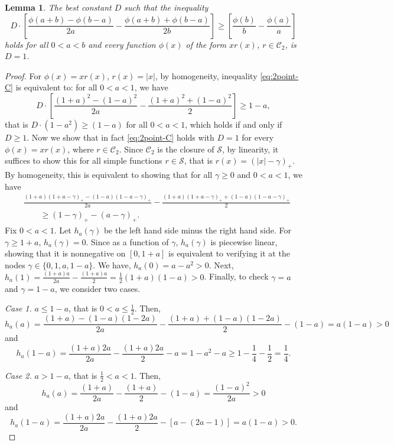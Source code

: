 \documentclass[10pt]{article}
\newcommand{\1}{\textbf{1}}
\newtheorem{lemma}[theorem]{Lemma}
\theoremstyle{remark}
\theoremstyle{definition}
\begin{document}
\begin{lemma}\label{lm:2point-C}
The best constant $D$ such that the inequality
\begin{equation}\label{eq:2point-C}
D\cdot\left[\frac{\phi(a+b)-\phi(b-a)}{2a} - \frac{\phi(a+b)+\phi(b-a)}{2b}\right] \geq \left[ \frac{\phi(b)}{b}-\frac{\phi(a)}{a}\right]
\end{equation}
holds for all $0 < a < b$ and every function $\phi(x)$ of the form $xr(x)$, $r \in \mathcal{C}_2$, is $D=1$.
\end{lemma}
\begin{proof}
For $\phi(x) = xr(x)$, $r(x) = |x|$, by homogeneity, inequality \eqref{eq:2point-C} is equivalent to: for all $0 < a < 1$, we have
\[
D\cdot\left[\frac{(1+a)^2-(1-a)^2}{2a} - \frac{(1+a)^2+(1-a)^2}{2}\right] \geq 1-a,
\]
that is $D\cdot(1-a^2) \geq (1-a)$ for all $0 < a < 1$, which holds if and only if $D \geq 1$. Now we show that in fact \eqref{eq:2point-C} holds with $D=1$ for every $\phi(x) = xr(x)$, where $r \in \mathcal{C}_2$. Since $\mathcal{C}_2$ is the closure of $\mathcal{S}$, by linearity, it suffices to show this for all simple functions $r \in \mathcal{S}$, that is $r(x) = (|x|-\gamma)_+$. By homogeneity, this is equivalent to showing that for all $\gamma \geq 0$ and $0 < a < 1$, we have
\begin{align*}
&\frac{(1+a)(1+a-\gamma)_+-(1-a)(1-a-\gamma)_+}{2a} - \frac{(1+a)(1+a-\gamma)_++(1-a)(1-a-\gamma)_+}{2} \\
&\qquad\geq  (1-\gamma)_+-(a-\gamma)_+.
\end{align*}
Fix $0 < a < 1$. Let $h_a(\gamma)$ be the left hand side minus the right hand side. For $\gamma \geq 1+a$, $h_a(\gamma) = 0$. Since as a function of $\gamma$, $h_a(\gamma)$ is piecewise linear, showing that it is nonnegative on $[0,1+a]$ is equivalent to verifying it at the nodes $\gamma \in \{0, 1, a, 1-a\}$. We have, $h_a(0) = a-a^2 > 0$. Next, $h_a(1) = \frac{(1+a)a}{2a} - \frac{(1+a)a}{2} = \frac{1}{2}(1+a)(1-a) > 0$. Finally, to check $\gamma = a$ and $\gamma = 1-a$, we consider two cases.

\bigskip
\noindent
\emph{Case 1.} $a \leq 1-a$, that is $0< a \leq \frac{1}{2}$. Then,
\[
h_a(a) = \frac{(1+a)-(1-a)(1-2a)}{2a} - \frac{(1+a)+(1-a)(1-2a)}{2} - (1-a) = a(1-a) > 0
\]
and
\[
h_a(1-a) = \frac{(1+a)2a}{2a} - \frac{(1+a)2a}{2}-a = 1-a^2-a \geq 1 - \frac{1}{4} - \frac{1}{2} = \frac{1}{4}.
\]


\bigskip
\noindent
\emph{Case 2.} $a > 1-a$, that is $\frac{1}{2} < a <1$. Then,
\[
h_a(a) = \frac{(1+a)}{2a} - \frac{(1+a)}{2} - (1-a) = \frac{(1-a)^2}{2a} > 0
\]
and
\[
h_a(1-a) = \frac{(1+a)2a}{2a} - \frac{(1+a)2a}{2}-[a-(2a-1)] = a(1-a) > 0.
\]
\end{proof}
\end{document}
